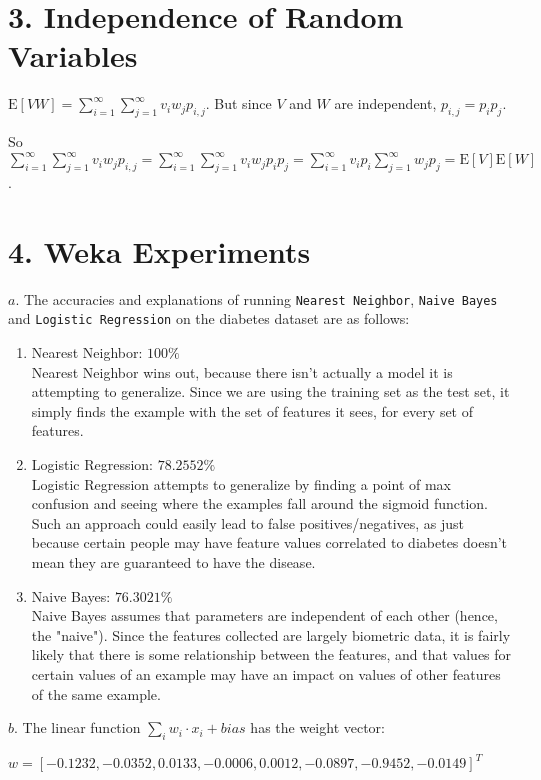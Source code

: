 \documentclass[11pt]{article}
\begin{document}
\section*{3. Independence of Random Variables}

\noindent $\text{E} [VW]= \sum\limits_{i=1}^{\infty}\sum\limits_{j=1}^{\infty} v_{i}w_{j}p_{i,j}$. But since $V$ and $W$ are independent, $p_{i,j}=p_{i}p_{j}$.

\noindent So $\sum\limits_{i=1}^{\infty}\sum\limits_{j=1}^{\infty} v_{i}w_{j}p_{i,j}=\sum\limits_{i=1}^{\infty}\sum\limits_{j=1}^{\infty}v_{i}w_{j}p_{i}p_{j}=\sum\limits_{i=1}^{\infty}v_{i}p_{i}\sum\limits_{j=1}^{\infty}w_{j}p_{j}=\text{E}[V]\text{E}[W]$.

\section*{4. Weka Experiments}
\noindent $a.$ The accuracies and explanations of running \texttt{Nearest Neighbor}, \texttt{Naive Bayes} and \texttt{Logistic Regression} on the diabetes dataset are as follows:
\begin{enumerate}
\item Nearest Neighbor: $100\%$\\
Nearest Neighbor wins out, because there isn't actually a model it is attempting to generalize. Since we are using the training set as the test set, it simply finds the example with the set of features it sees, for every set of features.
\item Logistic Regression: $78.2552\%$\\
Logistic Regression attempts to generalize by finding a point of max confusion and seeing where the examples fall around the sigmoid function. Such an approach could easily lead to false positives/negatives, as just because certain people may have feature values correlated to diabetes doesn't mean they are guaranteed to have the disease.
\item Naive Bayes: $76.3021\%$\\
Naive Bayes assumes that parameters are independent of each other (hence, the "naive"). Since the features collected are largely biometric data, it is fairly likely that there is some relationship between the features, and that values for certain values of an example may have an impact on values of other features of the same example. 
\end{enumerate}

\noindent $b.$ The linear function $\sum_{i} w_i \cdot x_i + bias$ has the weight vector:
\begin{center}$w = [-0.1232, -0.0352, 0.0133, -0.0006, 0.0012, -0.0897, -0.9452, -0.0149]^T$\end{center}
\end{document}
